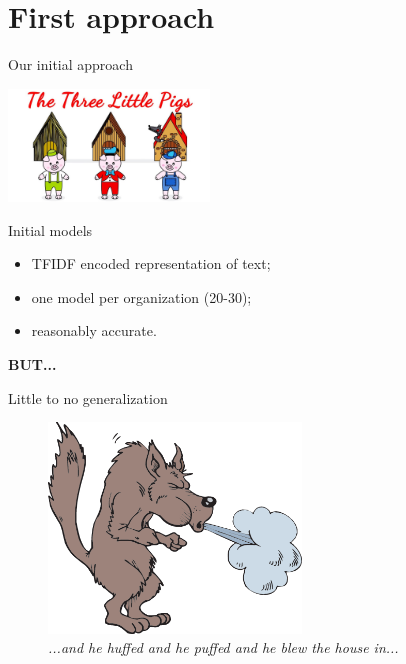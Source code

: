 \documentclass[9pt]{beamer}
\begin{document}
\section{First approach}
\begin{frame}{Our initial approach}
	\begin{center}
		\includegraphics[width=0.4\textwidth,height=!,trim={0 0 30cm 5cm},clip]{imgs/houses.jpg}
	\end{center}
\end{frame}

\begin{frame}{Initial models}
	\begin{itemize}
		\item TFIDF encoded representation of text;
		\item one model per organization (20-30);
		\item reasonably accurate.
	\end{itemize}
	\pause
	\vspace{1cm}
	\begin{center}
		\Large{\textbf{BUT...}}
	\end{center}
\end{frame}

\begin{frame}{Little to no generalization}
	\begin{center}
		\begin{figure}
			\includegraphics[width=0.6\textwidth,height=!]{imgs/huffedandpuffed.png}
			\caption{\textit{...and he huffed and he puffed and he blew the house in...}}
		\end{figure}
	\end{center}
\end{frame}
\end{document}
